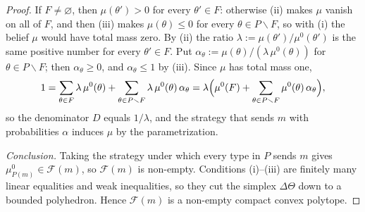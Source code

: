 \documentclass[11pt]{article}
\begin{document}
\begin{proof}
    If $F\neq\varnothing$, then $\mu(\theta')>0$ for every $\theta'\in F$: otherwise (ii) makes $\mu$ vanish on all of $F$, and then (iii) makes $\mu(\theta)\leq0$ for every $\theta\in P\smallsetminus F$, so with (i) the belief $\mu$ would have total mass zero. By (ii) the ratio $\lambda:=\mu(\theta')/\mu^0(\theta')$ is the same positive number for every $\theta'\in F$. Put $\alpha_\theta:=\mu(\theta)/(\lambda\,\mu^0(\theta))$ for $\theta\in P\smallsetminus F$; then $\alpha_\theta\geq0$, and $\alpha_\theta\leq1$ by (iii). Since $\mu$ has total mass one,
    \[
        1=\sum_{\theta\in F}\lambda\,\mu^0(\theta)+\sum_{\theta\in P\smallsetminus F}\lambda\,\mu^0(\theta)\,\alpha_\theta=\lambda\Bigl(\mu^0(F)+\sum_{\theta\in P\smallsetminus F}\mu^0(\theta)\,\alpha_\theta\Bigr),
    \]
    so the denominator $D$ equals $1/\lambda$, and the strategy that sends $m$ with probabilities $\alpha$ induces $\mu$ by the parametrization.

    \emph{Conclusion.} Taking the strategy under which every type in $P$ sends $m$ gives $\mu^0_{P(m)}\in\mathcal{F}(m)$, so $\mathcal{F}(m)$ is non-empty. Conditions (i)--(iii) are finitely many linear equalities and weak inequalities, so they cut the simplex $\Delta\Theta$ down to a bounded polyhedron. Hence $\mathcal{F}(m)$ is a non-empty compact convex polytope.
\end{proof}
\end{document}
